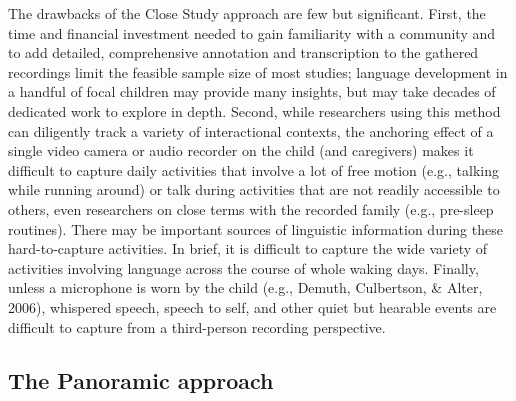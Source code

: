 \documentclass[,man,mask,floatsintext]{apa6}
\begin{document}
The drawbacks of the Close Study approach are few but significant.
First, the time and financial investment needed to gain familiarity with
a community and to add detailed, comprehensive annotation and
transcription to the gathered recordings limit the feasible sample size
of most studies; language development in a handful of focal children may
provide many insights, but may take decades of dedicated work to explore
in depth. Second, while researchers using this method can diligently
track a variety of interactional contexts, the anchoring effect of a
single video camera or audio recorder on the child (and caregivers)
makes it difficult to capture daily activities that involve a lot of
free motion (e.g., talking while running around) or talk during
activities that are not readily accessible to others, even researchers
on close terms with the recorded family (e.g., pre-sleep routines).
There may be important sources of linguistic information during these
hard-to-capture activities. In brief, it is difficult to capture the
wide variety of activities involving language across the course of whole
waking days. Finally, unless a microphone is worn by the child (e.g.,
Demuth, Culbertson, \& Alter, 2006), whispered speech, speech to self,
and other quiet but hearable events are difficult to capture from a
third-person recording perspective.

\subsection{The Panoramic approach}\label{the-panoramic-approach}
\end{document}

